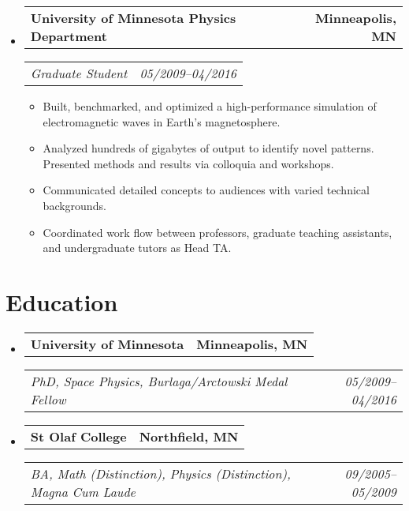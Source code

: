 \documentclass[11pt,letterpaper]{article}
\makeatletter
\newcommand{\headerrow}[2]{
  \begin{tabular*}{\linewidth}{l@{ \extracolsep{\fill} }r} #1 & #2
  \end{tabular*}}
\newcommand{\YearRange}[2]{#1--#2}
\newcommand{\ResumeSection}[1]{
  \section*{ {\color{MidnightBlue}#1 \sout{\hfill} } } }
\makeatother
\begin{document}
\begin{itemize}[leftmargin=\parindent]
  \item[]
    \headerrow{ \textbf{University of Minnesota Physics Department} }
              { \textbf{Minneapolis, MN} }
    \headerrow{ \emph{Graduate Student} }
              { \emph{ \YearRange{05/2009}{04/2016} } }
    \begin{itemize}
        \item Built, benchmarked, and optimized a high-performance simulation of electromagnetic waves in Earth's magnetosphere.
        \item Analyzed hundreds of gigabytes of output to identify novel patterns. Presented methods and results via colloquia and workshops.
        \item Communicated detailed concepts to audiences with varied technical backgrounds.
        \item Coordinated work flow between professors, graduate teaching assistants, and undergraduate tutors as Head TA.
    \end{itemize}

\end{itemize}


\ResumeSection{Education}

\begin{itemize}[leftmargin=\parindent]
  \parskip=0.1em

  \item[]
    \headerrow{ \textbf{University of Minnesota} }{ \textbf{Minneapolis, MN} }
    \headerrow{ \emph{PhD, Space Physics, Burlaga/Arctowski Medal Fellow} }
              { \emph{ \YearRange{05/2009}{04/2016} } }

    \item[]
      \headerrow{ \textbf{St Olaf College} }{ \textbf{Northfield, MN} }
      \headerrow{ \emph{BA, Math (Distinction), Physics (Distinction),
                 Magna Cum Laude} }
                { \emph{ \YearRange{09/2005}{05/2009} } }

\end{itemize}


\end{document}
